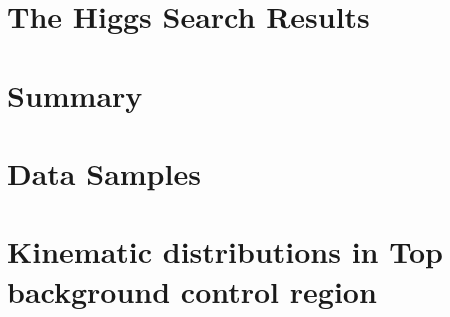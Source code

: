 \documentclass{cmspaper}
\begin{document}
\newpage 


\section{The Higgs Search Results}
   \label{sec:dataresults}
   

\section{Summary}
     \label{sec:summary}



\clearpage 
\appendix
\appendixpage

\section{Data Samples}
  \label{sec:appendix_datasets}
  
\clearpage
\section{Kinematic distributions in Top background control region}
  \label{sec:appendix_toptag_data}
  
\clearpage


\end{document}
